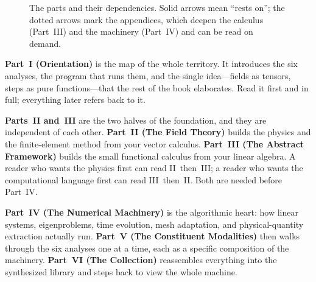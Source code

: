\begin{figure}[t]
\centering
{}
\caption[Reading roadmap]{The parts and their dependencies. Solid arrows mean
``rests on''; the dotted arrows mark the appendices, which deepen the calculus
(Part~III) and the machinery (Part~IV) and can be read on demand.}
\label{fig:roadmap}
\end{figure}

\textbf{Part~I (Orientation)} is the map of the whole territory. It introduces
the six analyses, the program that runs them, and the single idea---fields as
tensors, steps as pure functions---that the rest of the book elaborates. Read it
first and in full; everything later refers back to it.

\textbf{Parts~II and~III} are the two halves of the foundation, and they are
independent of each other. \textbf{Part~II (The Field Theory)} builds the
physics and the finite-element method from your vector calculus.
\textbf{Part~III (The Abstract Framework)} builds the small functional calculus
from your linear algebra. A reader who wants the physics first can read
II~then~III; a reader who wants the computational language first can read
III~then~II. Both are needed before Part~IV.

\textbf{Part~IV (The Numerical Machinery)} is the algorithmic heart: how linear
systems, eigenproblems, time evolution, mesh adaptation, and physical-quantity
extraction actually run. \textbf{Part~V (The Constituent Modalities)} then walks
through the six analyses one at a time, each as a specific composition of the
machinery. \textbf{Part~VI (The Collection)} reassembles everything into the
synthesized library and steps back to view the whole machine.

